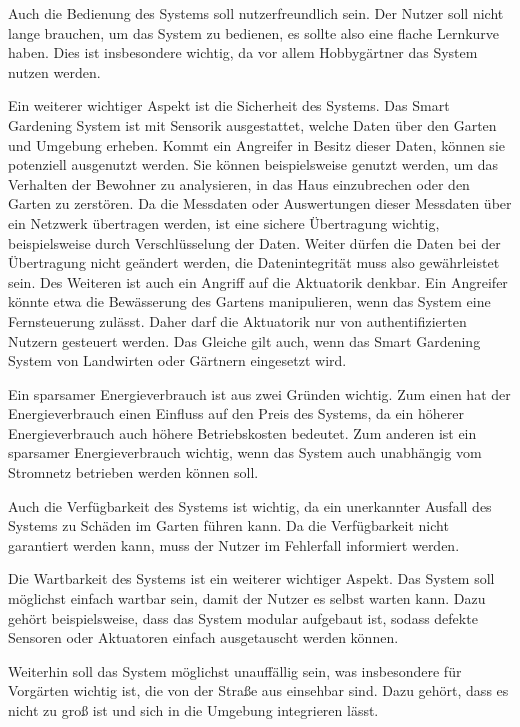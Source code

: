 Auch die Bedienung des Systems soll nutzerfreundlich sein.
Der Nutzer soll nicht lange brauchen, um das System zu bedienen, es sollte also eine flache Lernkurve haben.
Dies ist insbesondere wichtig, da vor allem Hobbygärtner das System nutzen werden.

Ein weiterer wichtiger Aspekt ist die Sicherheit des Systems.
Das Smart Gardening System ist mit Sensorik ausgestattet, welche Daten über den Garten und Umgebung erheben.
Kommt ein Angreifer in Besitz dieser Daten, können sie potenziell ausgenutzt werden.
Sie können beispielsweise genutzt werden, um das Verhalten der Bewohner zu analysieren, in das Haus einzubrechen oder den Garten zu zerstören.
Da die Messdaten oder Auswertungen dieser Messdaten über ein Netzwerk übertragen werden, ist eine sichere Übertragung wichtig, beispielsweise durch Verschlüsselung der Daten.
Weiter dürfen die Daten bei der Übertragung nicht geändert werden, die Datenintegrität muss also gewährleistet sein.
Des Weiteren ist auch ein Angriff auf die Aktuatorik denkbar.
Ein Angreifer könnte etwa die Bewässerung des Gartens manipulieren, wenn das System eine Fernsteuerung zulässt.
Daher darf die Aktuatorik nur von authentifizierten Nutzern gesteuert werden.
Das Gleiche gilt auch, wenn das Smart Gardening System von Landwirten oder Gärtnern eingesetzt wird.

Ein sparsamer Energieverbrauch ist aus zwei Gründen wichtig.
Zum einen hat der Energieverbrauch einen Einfluss auf den Preis des Systems, da ein höherer Energieverbrauch auch höhere Betriebskosten bedeutet.
Zum anderen ist ein sparsamer Energieverbrauch wichtig, wenn das System auch unabhängig vom Stromnetz betrieben werden können soll.

Auch die Verfügbarkeit des Systems ist wichtig, da ein unerkannter Ausfall des Systems zu Schäden im Garten führen kann.
Da die Verfügbarkeit nicht garantiert werden kann, muss der Nutzer im Fehlerfall informiert werden.

Die Wartbarkeit des Systems ist ein weiterer wichtiger Aspekt.
Das System soll möglichst einfach wartbar sein, damit der Nutzer es selbst warten kann.
Dazu gehört beispielsweise, dass das System modular aufgebaut ist, sodass defekte Sensoren oder Aktuatoren einfach ausgetauscht werden können.

Weiterhin soll das System möglichst unauffällig sein, was insbesondere für Vorgärten wichtig ist, die von der Straße aus einsehbar sind.
Dazu gehört, dass es nicht zu groß ist und sich in die Umgebung integrieren lässt.

